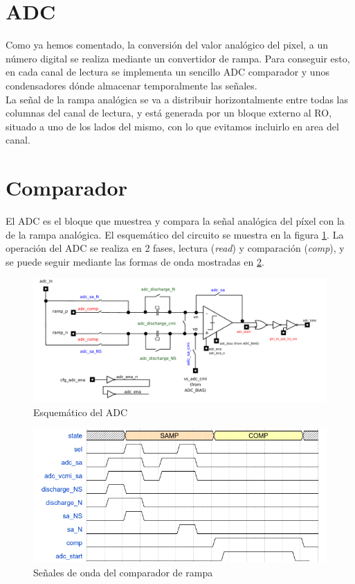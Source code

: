 \section{ADC}\label{cap:ro_sch_adc_top}

Como ya hemos comentado, la conversión del valor analógico del pixel, a un número
digital se realiza mediante un convertidor de rampa. Para conseguir esto,
en cada canal de lectura se implementa un sencillo ADC comparador y unos condensadores
dónde almacenar temporalmente las señales.\\

La señal de la rampa analógica se va a distribuir horizontalmente entre todas las
columnas del canal de lectura, y está generada por un bloque externo al RO, situado
a uno de los lados del mismo, con lo que evitamos incluirlo en area del canal.\\

\section{Comparador}\label{cap:ro_sch_adc}

El ADC es el bloque que muestrea y compara la señal analógica del píxel con la de la
rampa analógica. El esquemático del circuito se muestra en la figura \ref{fig:adc_sch}.
La operación del ADC se realiza en 2 fases, lectura (\textit{read}) y comparación
(\textit{comp}), y se puede seguir mediante las formas de onda mostradas en \ref{fig:adc_wave}.\\

\begin{figure}[h]
	\includegraphics[width=\textwidth]{svg/adc_sch.pdf}
	\caption{Esquemático del ADC}
	\label{fig:adc_sch}
\end{figure}

\begin{figure}[h]
	\includegraphics[width=\textwidth]{img/adc_wave.png}
	\caption{Señales de onda del comparador de rampa}
	\label{fig:adc_wave}
\end{figure}

